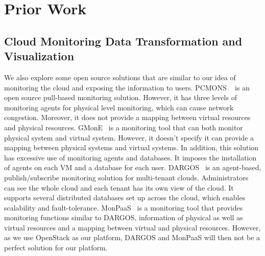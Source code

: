 

\section{Prior Work}
\label{sec:PriorWork}



\subsection{Cloud Monitoring Data Transformation and Visualization}

  We also explore some open source solutions that are similar to our idea of monitoring the cloud and exposing the information to users. PCMONS ~\cite{chaves2011toward} is an open source pull-based monitoring solution. However, it has three levels of monitoring agents for physical level monitoring, which can cause network congestion. Moreover, it does not provide a mapping between virtual resources and physical resources. 
  GMonE~\cite{montes2013gmone} is a monitoring tool that can both monitor physical system and virtual system. However, it doesn't specify it can provide a mapping between physical systems and virtual systems. In addition, this solution has excessive use of monitoring agents and databases. It imposes the installation of agents on each VM and a database for each user. 
  DARGOS~\cite{povedano2013dargos}  is an agent-based, publish/subscribe monitoring solution for multi-tenant clouds. Administrators can see the whole cloud and each tenant has its own view of the cloud. It supports several distributed databases set up across the cloud, which enables scalability and fault-tolerance. MonPaaS~\cite{alcaraz2015monpaas} is a monitoring tool that provides monitoring functions similar to DARGOS, information of physical as well as virtual resources and a mapping between virtual and physical resources. However, as we use OpenStack as our platform, DARGOS and MonPaaS will then not be a perfect solution for our  platform.